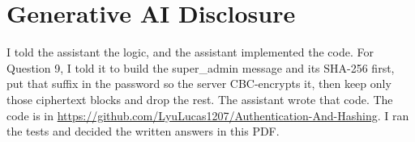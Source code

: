 \documentclass[12pt]{article}
\begin{document}
\section*{Generative AI Disclosure}

I told the assistant the logic, and the assistant implemented the code. For Question 9, I told it to build the super\_admin message and its SHA-256 first, put that suffix in the password so the server CBC-encrypts it, then keep only those ciphertext blocks and drop the rest. The assistant wrote that code. The code is in \url{https://github.com/LyuLucas1207/Authentication-And-Hashing}. I ran the tests and decided the written answers in this PDF.
\end{document}
